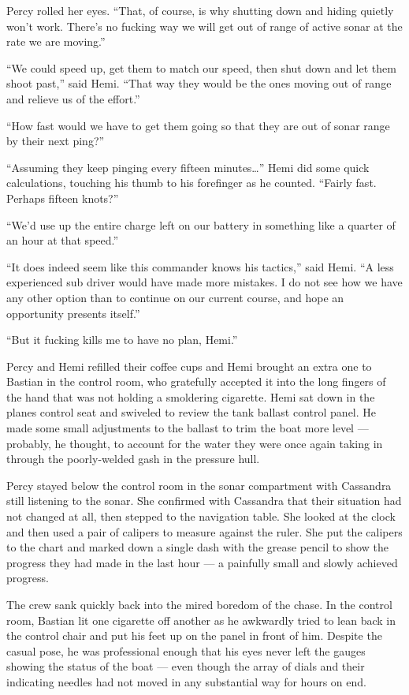 \documentclass[
]{scrbook}
\begin{document}
Percy rolled her eyes. ``That, of course, is why shutting down and
hiding quietly won't work. There's no fucking way we will get out of
range of active sonar at the rate we are moving.''

``We could speed up, get them to match our speed, then shut down and let
them shoot past,'' said Hemi. ``That way they would be the ones moving
out of range and relieve us of the effort.''

``How fast would we have to get them going so that they are out of sonar
range by their next ping?''

``Assuming they keep pinging every fifteen minutes\ldots{}'' Hemi did
some quick calculations, touching his thumb to his forefinger as he
counted. ``Fairly fast. Perhaps fifteen knots?''

``We'd use up the entire charge left on our battery in something like a
quarter of an hour at that speed.''

``It does indeed seem like this commander knows his tactics,'' said
Hemi. ``A less experienced sub driver would have made more mistakes. I
do not see how we have any other option than to continue on our current
course, and hope an opportunity presents itself.''

``But it fucking kills me to have no plan, Hemi.''

\bigskip

Percy and Hemi refilled their coffee cups and Hemi brought an extra one
to Bastian in the control room, who gratefully accepted it into the long
fingers of the hand that was not holding a smoldering cigarette. Hemi
sat down in the planes control seat and swiveled to review the tank
ballast control panel. He made some small adjustments to the ballast to
trim the boat more level --- probably, he thought, to account for the
water they were once again taking in through the poorly-welded gash in
the pressure hull.

Percy stayed below the control room in the sonar compartment with
Cassandra still listening to the sonar. She confirmed with Cassandra
that their situation had not changed at all, then stepped to the
navigation table. She looked at the clock and then used a pair of
calipers to measure against the ruler. She put the calipers to the chart
and marked down a single dash with the grease pencil to show the
progress they had made in the last hour --- a painfully small and slowly
achieved progress.

The crew sank quickly back into the mired boredom of the chase. In the
control room, Bastian lit one cigarette off another as he awkwardly
tried to lean back in the control chair and put his feet up on the panel
in front of him. Despite the casual pose, he was professional enough
that his eyes never left the gauges showing the status of the boat ---
even though the array of dials and their indicating needles had not
moved in any substantial way for hours on end.
\end{document}
